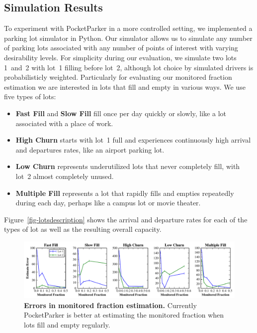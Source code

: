 \subsection{Simulation Results}
\label{subsec-simulator}

To experiment with PocketParker in a more controlled setting, we implemented
a parking lot simulator in Python. Our simulator allows us to simulate any
number of parking lots associated with any number of points of interest with
varying desirability levels. For simplicity during our evaluation, we
simulate two lots 1~and~2 with lot~1 filling before lot~2, although lot
choice by simulated drivers is probabilisticly weighted. Particularly for
evaluating our monitored fraction estimation we are interested in lots that
fill and empty in various ways. We use five types of lots:

\begin{itemize}

\item \textbf{Fast Fill} and \textbf{Slow Fill} fill once per day quickly or
slowly, like a lot associated with a place of work.

\item \textbf{High Churn} starts with lot~1 full and experiences continuously
high arrival and departures rates, like an airport parking lot.

\item \textbf{Low Churn} represents underutilized lots that never completely
fill, with lot~2 almost completely unused.

\item \textbf{Multiple Fill} represents a lot that rapidly fills and empties
repeatedly during each day, perhaps like a campus lot or movie theater.

\end{itemize}

Figure~\ref{fig-lotsdescription} shows the arrival and departure rates for each
of the types of lot as well as the resulting overall capacity.

\begin{figure}
\centering
\includegraphics[width=\textwidth]{./simulator/figures/capacity_experiment.pdf}

\caption{\textbf{Errors in monitored fraction estimation.} Currently
PocketParker is better at estimating the monitored fraction when lots fill
and empty regularly.}

\label{fig-capacityerrors}
\end{figure}

